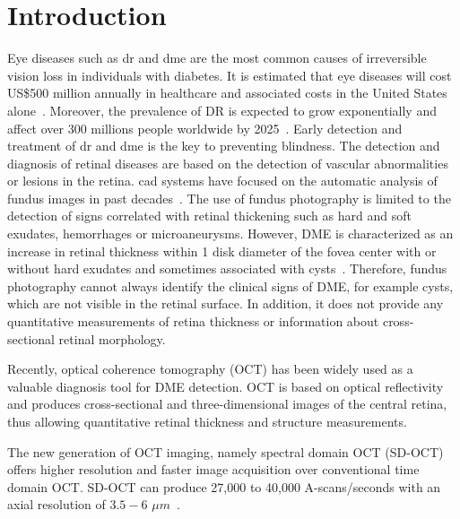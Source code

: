\graphicspath{ {./content/intro/figures/} }

\section{Introduction}

Eye diseases such as \ac{dr} and \ac{dme} are the most common causes of irreversible vision loss in individuals with diabetes. It is estimated that eye diseases will cost US\$500 million annually in healthcare and associated costs in the United States alone~\cite{Sharma2005}. Moreover, the prevalence of DR is expected to grow exponentially and affect over 300 millions people worldwide by 2025~\cite{Wild2004}.
Early detection and treatment of \ac{dr} and \ac{dme} is the key to preventing blindness.
The detection and diagnosis of retinal diseases are based on the detection of vascular abnormalities or lesions in the retina. 
\Ac{cad} systems have focused on the automatic analysis of fundus images in past decades~\cite{Abramoff2010,Trucco2013}.
The use of fundus photography is limited to the detection of signs correlated with retinal thickening such as hard and soft exudates, hemorrhages or microaneurysms.
However, DME is characterized as an increase in retinal thickness within 1 disk diameter of the fovea center with or without hard exudates and sometimes associated with cysts~\cite{ETDRSG1985}.
Therefore, fundus photography cannot always identify the clinical signs of DME, for example cysts, which are not visible in the retinal surface. In addition, it does not provide any quantitative measurements of retina thickness or information about cross-sectional retinal morphology. 

Recently, optical coherence tomography (OCT) has been widely used as a valuable diagnosis tool for DME detection.
OCT is based on optical reflectivity and produces cross-sectional and three-dimensional images of the central retina, thus allowing quantitative retinal thickness and structure measurements. 

The new generation of OCT imaging, namely spectral domain OCT (SD-OCT) offers higher resolution and faster image acquisition over conventional time domain OCT. SD-OCT can produce 27,000 to 40,000 A-scans/seconds with an axial resolution of $3.5-6$ $\mu m$~\cite{Chen2005}. 

